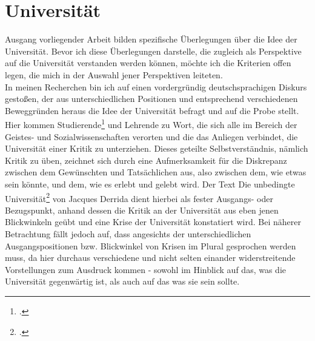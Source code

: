 

\section{Universität}

Ausgang vorliegender Arbeit bilden spezifische Überlegungen über die Idee der
Universität. Bevor ich diese Überlegungen darstelle, die zugleich als
Perspektive auf die Universität verstanden werden können, möchte ich die
Kriterien offen legen, die mich in der Auswahl jener Perspektiven leiteten.\\

In meinen Recherchen bin ich auf einen vordergründig deutschsprachigen Diskurs
gestoßen, der aus unterschiedlichen Positionen und entsprechend verschiedenen
Beweggründen heraus die Idee der Universität befragt und auf die Probe stellt.
Hier kommen Studierende\footnotemark \footcitetext{lohman} und Lehrende\footnotemark {} zu Wort, die sich alle im Bereich der Geistes- und
  Sozialwissenschaften verorten und die das Anliegen verbindet, die Universität
  einer Kritik zu unterziehen. Dieses geteilte Selbstverständnis, nämlich
  Kritik zu üben, zeichnet sich durch eine Aufmerksamkeit für die Diskrepanz
  zwischen dem Gewünschten und Tatsächlichen aus, also zwischen dem, wie etwas
  sein könnte, und dem, wie es erlebt und gelebt wird.\footnotemark
   Der Text \glqq Die
  unbedingte Universität\grqq\footnotemark \footcitetext{derrida} von Jacques Derrida dient hierbei als fester
  Ausgangs- oder Bezugspunkt, anhand dessen die Kritik an der Universität aus
  eben jenen Blickwinkeln geübt und eine Krise der Universität konstatiert
  wird.  Bei näherer Betrachtung fällt jedoch auf, dass angesichts der
  unterschiedlichen Ausgangspositionen bzw. Blickwinkel von Krisen im Plural
  gesprochen werden muss, da hier durchaus verschiedene und nicht selten
  einander widerstreitende Vorstellungen zum Ausdruck kommen - sowohl im
  Hinblick auf das, was die Universität gegenwärtig ist, als auch auf das was sie sein
  sollte. \\

